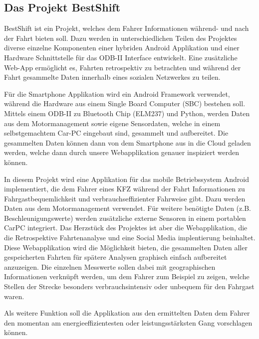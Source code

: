 \subsection{Das Projekt BestShift}

BestShift ist ein Projekt, welches dem Fahrer Informationen während- und nach der Fahrt bieten soll. 
Dazu werden in unterschiedlichen Teilen des Projektes 
diverse einzelne Komponenten einer hybriden Android Applikation und einer Hardware Schnittstelle für das ODB-II 
Interface entwickelt. 
Eine zusätzliche Web-App ermöglicht es, Fahrten retrospektiv zu betrachten und während der Fahrt gesammelte Daten innerhalb eines sozialen Netzwerkes zu teilen.
 

Für die Smartphone Applikation wird ein Android Framework verwendet, 
während die Hardware aus einem Single Board Computer (SBC) bestehen soll. 
Mittels einem ODB-II zu Bluetooth Chip (ELM237) und Python, 
werden Daten aus dem Motormanagement sowie eigene Sensordaten, welche in einem selbstgemachtem Car-PC eingebaut sind,
gesammelt und aufbereitet. 
Die gesammelten Daten können dann von dem Smartphone aus in die Cloud geladen werden, welche dann durch unsere
Webapplikation genauer inspiziert werden können.

In diesem Projekt wird eine Applikation für das mobile Betriebssystem Android implementiert, 
die dem Fahrer eines KFZ während der Fahrt Informationen zu Fahrgastbequemlichkeit und verbrauchseffizienter Fahrweise gibt. 
Dazu werden Daten aus dem Motormanagement verwendet. 
Für weitere benötigte Daten (z.B. Beschleunigungswerte) werden zusätzliche externe Sensoren in einem portablen CarPC integriert. 
Das Herzstück des Projektes ist aber die Webapplikation, die die Retrospektive Fahrtenanalyse und eine Social Media implentierung beinhaltet.
Diese Webapplikation wird die Möglichkeit bieten, die gesammelten Daten aller gespeicherten 
Fahrten für spätere Analysen graphisch einfach aufbereitet anzuzeigen. 
Die einzelnen Messwerte sollen dabei mit geographischen Informationen verknüpft werden, 
um dem Fahrer zum Beispiel zu zeigen, welche Stellen der Strecke besonders verbrauchsintensiv oder unbequem für den Fahrgast waren. 

Als weitere Funktion soll die Applikation aus den ermittelten Daten dem Fahrer den 
momentan am energieeffizientesten oder leistungsstärksten Gang vorschlagen können.
\clearpage %